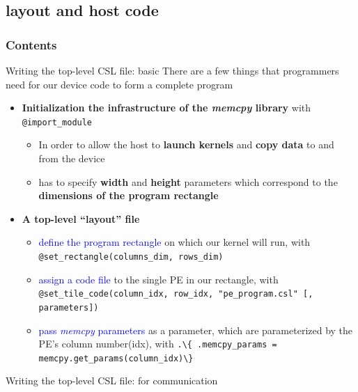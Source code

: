 \documentclass[dvipdfmx, 11pt, aspectratio=169]{beamer}   %
\begin{document}
\subsection{layout and host code}
\begin{frame}
    \frametitle{Contents}
    \tableofcontents[currentsubsection]
\end{frame}
\begin{frame}{Writing the top-level CSL file: basic}
There are a few things that programmers need for our device code to form a complete program
\begin{itemize}
    \item \textbf{Initialization the infrastructure of the \textit{memcpy} library} with \lstinline|@import_module|
    \begin{itemize}
        \item In order to allow the host to \textbf{launch kernels} and \textbf{copy data} to and from the device
        \item has to specify \textbf{width} and \textbf{height} parameters which correspond to the \textbf{dimensions of the program rectangle}
    \end{itemize}
    \item \textbf{A top-level “layout” file}
    \begin{itemize}
        \item \textcolor{blue}{define the program rectangle} on which our kernel will run, with \lstinline|@set_rectangle(columns_dim, rows_dim)|
        \item \textcolor{blue}{assign a code file} to the single PE in our rectangle, with \lstinline|@set_tile_code(column_idx, row_idx, "pe_program.csl" [, parameters])|
        \item \textcolor{blue}{pass \textit{memcpy} parameters} as a parameter, which are parameterized by the PE's column number(idx), with \lstinline|.\{ .memcpy_params = memcpy.get_params(column_idx)\}|
    \end{itemize}
\end{itemize}
\end{frame}
\begin{frame}{Writing the top-level CSL file: for communication}

\end{frame}
\end{document}
